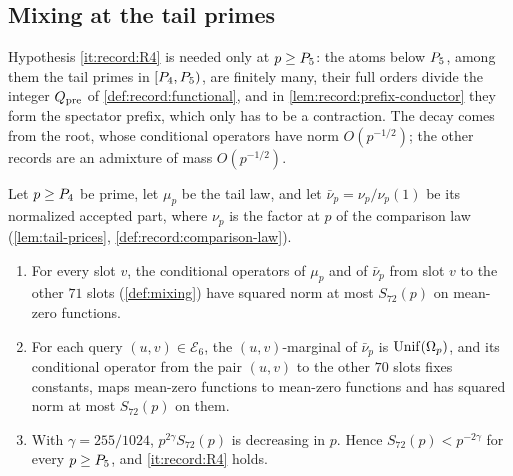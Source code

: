 \subsection{Mixing at the tail primes}\label{subsec:tail-mixing}

Hypothesis \ref{it:record:R4} is needed only at $p\ge P_5$: the atoms
below $P_5$, among them the tail primes in $[P_4,P_5)$, are finitely
many, their full orders divide the integer $Q_{\rm pre}$ of
\cref{def:record:functional}, and in \cref{lem:record:prefix-conductor} they
form the spectator prefix, which only has to be a contraction. The decay
comes from the root, whose conditional operators have norm $O(p^{-1/2})$;
the other records are an admixture of mass $O(p^{-1/2})$.

\begin{lemma}\label{lem:record:tail-mixing}
Let $p\ge P_4$ be prime, let $\mu_p$ be the tail law, and let
$\bar\nu_p=\nu_p/\nu_p(1)$ be its normalized accepted part, where $\nu_p$ is
the factor at $p$ of the comparison law (\cref{lem:tail-prices},
\cref{def:record:comparison-law}).
\begin{enumerate}[label=(\alph*)]
\item For every slot $v$, the conditional operators of $\mu_p$ and of
 $\bar\nu_p$ from slot $v$ to the other $71$ slots (\cref{def:mixing}) have
 squared norm at most $S_{72}(p)$ on mean-zero functions.
\item For each query $(u,v)\in\mathcal E_6$, the $(u,v)$-marginal of
 $\bar\nu_p$ is $\operatorname{Unif}(\Omega_{p})$, and its conditional operator from the pair
 $(u,v)$ to the other $70$ slots fixes constants, maps mean-zero functions
 to mean-zero functions and has squared norm at most $S_{72}(p)$ on them.
\item With $\gamma=255/1024$, $p^{2\gamma}S_{72}(p)$ is decreasing in $p$.
 Hence $S_{72}(p)<p^{-2\gamma}$ for every $p\ge P_5$, and
 \ref{it:record:R4} holds.
\end{enumerate}
\end{lemma}

